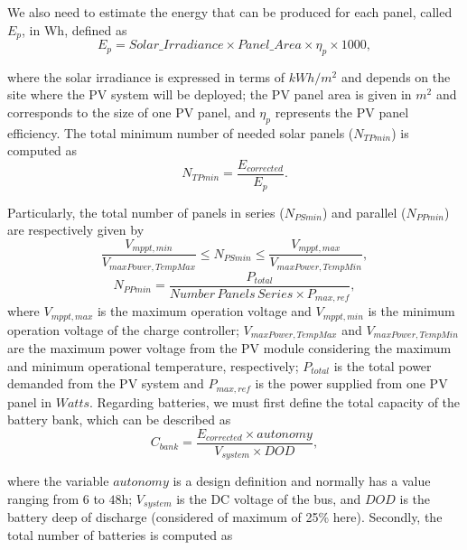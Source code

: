 We also need to estimate the energy that can be produced for each panel, called $E_{p}$, in Wh, defined as
%
\begin{equation}
\label{eq:Ep}
E_{p} = Solar\_Irradiance \times Panel\_Area \times \eta_{p} \times 1000,
\end{equation}

\noindent where the solar irradiance is expressed in terms of $kWh/m^{2}$ and depends on the site where the PV system will be deployed; 
the PV panel area is given in $m^{2}$ and corresponds to the size of one PV panel, and $\eta_{p}$ represents the PV panel efficiency.
The total minimum number of needed solar panels ($N_{TPmin}$) is computed as
%
\begin{equation}
\label{eq:NTPmin}
N_{TPmin} = \dfrac{E_{corrected}}{E_{p}}.
\end{equation}

Particularly, the total number of panels in series ($N_{PSmin}$) and parallel ($N_{PPmin}$) are respectively given by
%
\begin{equation}
\label{eq:NPSmin}
\dfrac{V_{mppt,min}}{V_{maxPower,TempMax}} \leq N_{PSmin} \leq \dfrac{V_{mppt,max}}{V_{maxPower,TempMin}},
\end{equation}
%
\begin{equation}
\label{eq:NPPmin}
N_{PPmin} = \dfrac{P_{total}}{Number\,Panels\,Series \times P_{max,ref}},
\end{equation}
%
\noindent where $V_{mppt,max}$ is the maximum operation voltage and $V_{mppt,min}$ 
is the minimum operation voltage of the charge controller; $V_{maxPower,TempMax}$ and 
$V_{maxPower,TempMin}$ are the maximum power voltage from the PV module considering 
the maximum and minimum operational temperature, respectively; 
$P_{total}$ is the total power demanded from the PV system and 
$P_{max,ref}$ is the power supplied from one PV panel in $Watts$.
Regarding batteries, we must first define the total capacity of the battery bank, which can be described as
%
\begin{equation}
\label{eq:Cbank}
C_{bank} = \dfrac{E_{corrected} \times autonomy}{V_{system} \times DOD},
\end{equation}

\noindent where the variable $autonomy$ is a design definition and normally has a value ranging from $6$ to $48$h; 
$ V_{system} $ is the DC voltage of the bus, and $ DOD $ is the battery deep of discharge (considered of maximum of 25\% here).
%
Secondly, the total number of batteries is computed as 

